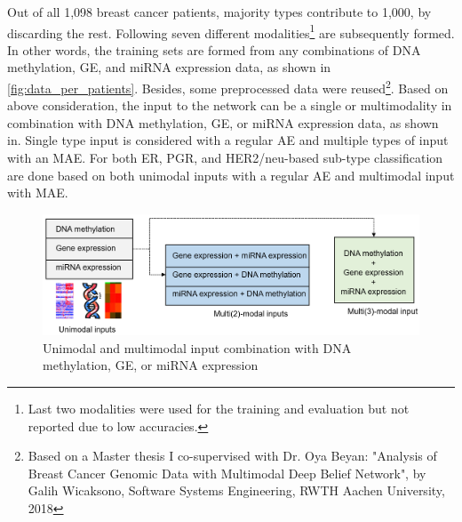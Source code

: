 \hspace*{3.5mm} Out of all 1,098 breast cancer patients, majority types contribute to 1,000, by discarding the rest. Following seven different modalities\footnote{Last two modalities were used for the training and evaluation but not reported due to low accuracies.} are subsequently formed. In other words, the training sets are formed from any combinations of DNA methylation, GE, and miRNA expression data, as shown in \cref{fig:data_per_patients}. Besides, some preprocessed data were reused\footnote{Based on a Master thesis I co-supervised with Dr. Oya Beyan: "Analysis of Breast Cancer Genomic Data with Multimodal Deep Belief Network", by Galih Wicaksono, Software Systems Engineering, RWTH Aachen University, 2018}. Based on above consideration, the input to the network can be a single or multimodality in combination with DNA methylation, GE, or miRNA expression data, as shown in. Single type input is considered with a regular AE and multiple types of input with an MAE. For both ER, PGR, and HER2/neu-based sub-type classification are done based on both unimodal inputs with a regular AE and multimodal input with MAE. 

\begin{figure}
	\centering
	\includegraphics[scale=0.7]{images/input_combination.png}
	\caption[Different uni- and multi-modality input combination]{Unimodal and multimodal input combination with DNA methylation, GE, or miRNA expression}
	\label{fig:input_comb}
\end{figure}

